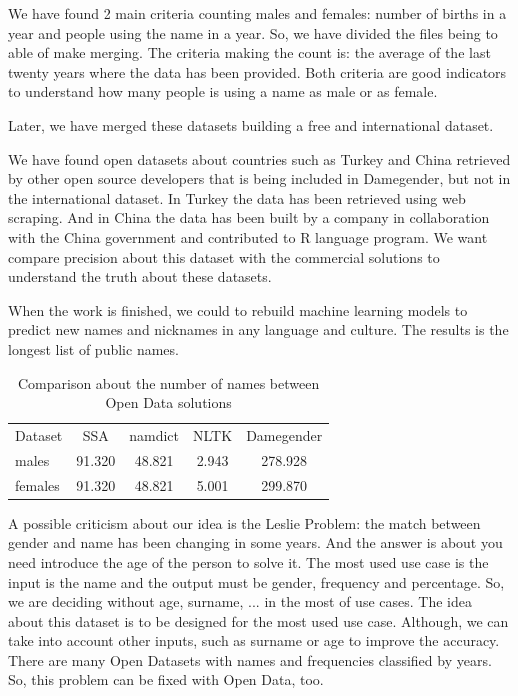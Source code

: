 \documentclass[a4paper]{article}
\begin{document}
We have found 2 main criteria counting males and females: number of
births in a year and people using the name in a year. So, we have
divided the files being to able of make merging. The criteria making
the count is: the average of the last twenty years where the data has
been provided. Both criteria are good indicators to understand how
many people is using a name as male or as female.

Later, we have merged these datasets building a free and international
dataset.

We have found open datasets about countries such as Turkey and China
retrieved by other open source developers that is being included in
Damegender, but not in the international dataset. In Turkey the data
has been retrieved using web scraping. And in China the data has been
built by a company in collaboration with the China government and
contributed to R language program. We want compare precision about
this dataset with the commercial solutions to understand the truth
about these datasets.

When the work is finished, we could to rebuild machine learning models
to predict new names and nicknames in any language and culture. The
results is the longest list of public names.

\begin{table}[t]
\footnotesize
\begin{tabular}[]{lcccc}
  \hline
  Dataset & SSA & namdict & NLTK & Damegender \tabularnewline
  males & 91.320 & 48.821 & 2.943 & 278.928 \tabularnewline
  females & 91.320 & 48.821 & 5.001 & 299.870 \tabularnewline
  \hline
\end{tabular}
\caption{Comparison about the number of names between Open Data solutions}
\label{table:DifferentNamesMeasures}
\end{table}

A possible criticism about our idea is the Leslie
Problem\cite{blevins2015jane}: the match between gender and name has
been changing in some years. And the answer is about you need
introduce the age of the person to solve it. The most used use case is
the input is the name and the output must be gender, frequency and
percentage. So, we are deciding without age, surname, ... in the most
of use cases. The idea about this dataset is to be designed for the
most used use case. Although, we can take into account other inputs,
such as surname or age to improve the accuracy. There are many Open
Datasets with names and frequencies classified by years. So, this
problem can be fixed with Open Data, too.
\end{document}
